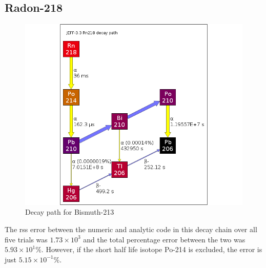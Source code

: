 \clearpage
\subsection{Radon-218}
\FloatBarrier

\begin{figure}[!h]
\centering
		\includegraphics[width=.4\linewidth]{appendix/activity_equation/decay_paths/86rn218_decay.png}
		\caption{Decay path for Bismuth-213 \cite{jeff311}}
		\label{fig:decayrn218}
\end{figure}
\FloatBarrier


The \acrshort{rss} error between the numeric and analytic code in this decay chain over all five trials was $1.73 \times 10^{3}$ and the total percentage error between the two was $5.93 \times 10^{1}\%$.  However, if the short half life isotope Po-214 is excluded, the error is just $5.15 \times 10^{-1}\%$.


